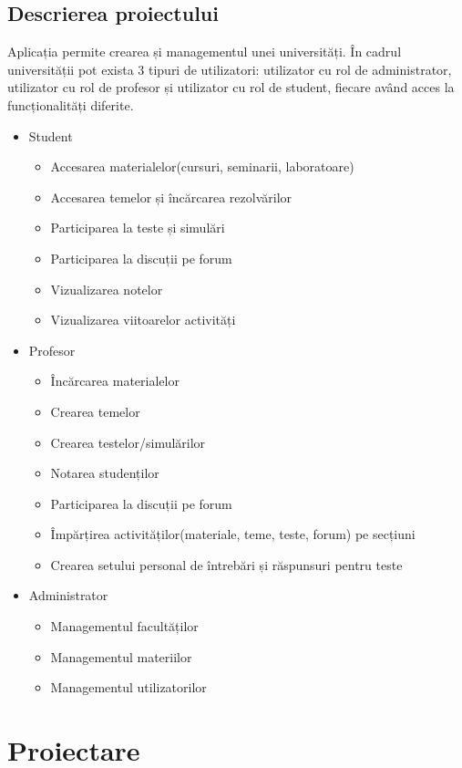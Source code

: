 \documentclass[12pt, a4paper, oneside, romanian]{teza-upb}
\begin{document}
\section{Descrierea proiectului}

Aplicația permite crearea și managementul unei universități. În cadrul universității pot exista 3 tipuri de utilizatori: utilizator cu rol de administrator, utilizator cu rol de profesor și utilizator cu rol de student, fiecare având acces la funcționalități diferite.
\begin{itemize}
	\item Student
		\begin{itemize}
			\item Accesarea materialelor(cursuri, seminarii, laboratoare)
			\item Accesarea temelor și încărcarea rezolvărilor
			\item Participarea la teste și simulări
			\item Participarea la discuții pe forum
			\item Vizualizarea notelor
			\item Vizualizarea viitoarelor activități
		\end{itemize}
	\item Profesor
		\begin{itemize}
			\item Încărcarea materialelor
			\item Crearea temelor
			\item Crearea testelor/simulărilor
			\item Notarea studenților
			\item Participarea la discuții pe forum
			\item Împărțirea activităților(materiale, teme, teste, forum) pe secțiuni
			\item Crearea setului personal de întrebări și răspunsuri pentru teste
		\end{itemize}
	\item Administrator
		\begin{itemize}
			\item Managementul facultăților
			\item Managementul materiilor
			\item Managementul utilizatorilor
		\end{itemize}
\end{itemize}

\chapter{Proiectare}
\end{document}
